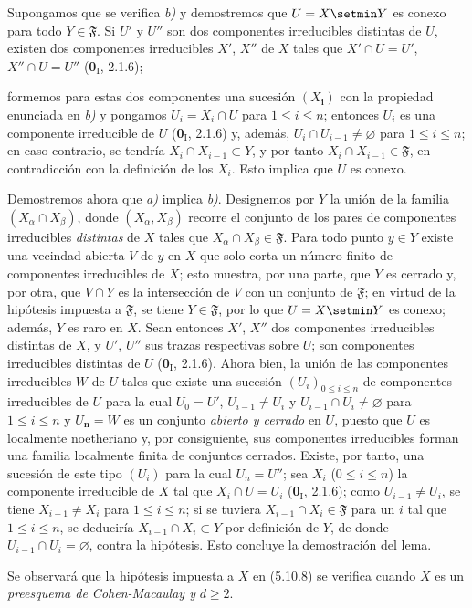 Supongamos que se verifica \emph{b)} y demostremos que $U=X\setmin Y$ es conexo para todo
$Y\in\mathfrak F$. Si $U'$ y $U''$ son dos componentes irreducibles distintas
de $U$, existen dos componentes irreducibles $X'$, $X''$ de $X$ tales que
$X'\cap U=U'$, $X''\cap U=U''$ (\textbf 0$_\mathrm I$, 2.1.6);


formemos para estas dos componentes una sucesión $(X_{\boldsymbol{i}})$ con la propiedad
enunciada en \emph{b)} y pongamos $U_i=X_i\cap U$ para $1\leq i\leq n$; entonces
$U_i$ es una componente irreducible de $U$ (\textbf 0$_\mathrm I$, 2.1.6) y, además,
$U_i\cap U_{i-1}\neq\varnothing$ para $1\leq i\leq n$; en caso contrario, se
tendría $X_i\cap X_{i-1}\subset Y$, y por tanto
$X_i\cap X_{i-1}\in\mathfrak F$, en contradicción con la definición de los
$X_i$. Esto implica que $U$ es conexo.

Demostremos ahora que \emph{a)} implica \emph{b)}. Designemos por $Y$ la unión de la familia
$(X_\alpha\cap X_\beta)$, donde $(X_\alpha,X_\beta)$ recorre el conjunto de
los pares de componentes irreducibles \emph{distintas} de $X$ tales que
$X_\alpha\cap X_\beta\in\mathfrak F$. Para todo punto $y\in Y$ existe una
vecindad abierta $V$ de $y$ en $X$ que solo corta un número finito de
componentes irreducibles de $X$; esto muestra, por una parte, que $Y$ es
cerrado y, por otra, que $V\cap Y$ es la intersección de $V$ con un conjunto
de $\mathfrak F$; en virtud de la hipótesis impuesta a $\mathfrak F$, se tiene
$Y\in\mathfrak F$, por lo que $U=X\setmin Y$ es conexo; además, $Y$ es raro en $X$.
Sean entonces $X'$, $X''$ dos componentes irreducibles distintas de $X$, y
$U'$, $U''$ sus trazas respectivas sobre $U$; son componentes irreducibles
distintas de $U$ (\textbf 0$_\mathrm I$, 2.1.6). Ahora bien, la unión de las
componentes irreducibles $W$ de $U$ tales que existe una sucesión
$(U_i)_{0\leq i\leq n}$ de componentes irreducibles de $U$ para la cual
$U_0=U'$, $U_{i-1}\neq U_i$ y $U_{i-1}\cap U_i\neq\varnothing$ para
$1\leq i\leq n$ y $U_{\boldsymbol{n}}=W$ es un conjunto \emph{abierto y cerrado} en $U$, puesto que
$U$ es localmente noetheriano y, por consiguiente, sus componentes
irreducibles forman una familia localmente finita de conjuntos cerrados.
Existe, por tanto, una sucesión de este tipo $(U_i)$ para la cual $U_n=U''$;
sea $X_i$ ($0\leq i\leq n$) la componente irreducible de $X$ tal que
$X_i\cap U=U_i$ (\textbf 0$_\mathrm I$, 2.1.6); como $U_{i-1}\neq U_i$, se tiene
$X_{i-1}\neq X_i$ para $1\leq i\leq n$; si se tuviera
$X_{i-1}\cap X_i\in\mathfrak F$ para un $i$ tal que $1\leq i\leq n$, se
deduciría $X_{i-1}\cap X_i\subset Y$ por definición de $Y$, de donde
$U_{i-1}\cap U_i=\varnothing$, contra la hipótesis. Esto concluye la
demostración del lema.

Se observará que la hipótesis impuesta a $X$ en (5.10.8) se verifica cuando
$X$ es un \emph{preesquema de Cohen-Macaulay y} $d\geq2$.

